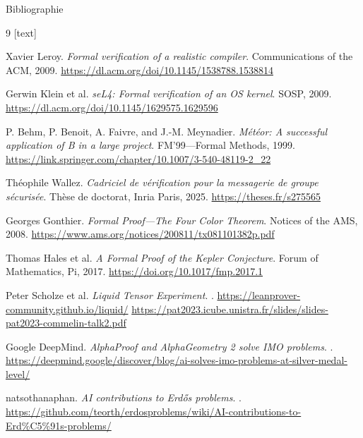 \documentclass[aspectratio=169]{beamer}
\begin{document}
\begin{frame}[allowframebreaks]{Bibliographie}
  \begin{thebibliography}{9}
    [text]

    Xavier Leroy.
    \newblock \emph{Formal verification of a realistic compiler}.
    \newblock Communications of the ACM, 2009.
    \newblock \url{https://dl.acm.org/doi/10.1145/1538788.1538814}

    Gerwin Klein et al.
    \newblock \emph{seL4: Formal verification of an OS kernel}.
    \newblock SOSP, 2009.
    \newblock \url{https://dl.acm.org/doi/10.1145/1629575.1629596}

    P. Behm, P. Benoit, A. Faivre, and J.-M. Meynadier.
    \newblock \emph{Météor: A successful application of B in a large project}.
    \newblock FM'99—Formal Methods, 1999.
    \newblock \url{https://link.springer.com/chapter/10.1007/3-540-48119-2_22}

    Théophile Wallez.
    \newblock \emph{Cadriciel de vérification pour la messagerie de groupe sécurisée}.
    \newblock Thèse de doctorat, Inria Paris, 2025.
    \newblock \url{https://theses.fr/s275565}

    Georges Gonthier.
    \newblock \emph{Formal Proof—The Four Color Theorem}.
    \newblock Notices of the AMS, 2008.
    \newblock \url{https://www.ams.org/notices/200811/tx081101382p.pdf}

    Thomas Hales et al.
    \newblock \emph{A Formal Proof of the Kepler Conjecture}.
    \newblock Forum of Mathematics, Pi, 2017.
    \newblock \url{https://doi.org/10.1017/fmp.2017.1}

    Peter Scholze et al.
    \newblock \emph{Liquid Tensor Experiment}.
    .
    \newblock \url{https://leanprover-community.github.io/liquid/}
    \newblock \url{https://pat2023.icube.unistra.fr/slides/slides-pat2023-commelin-talk2.pdf}

    Google DeepMind.
    \newblock \emph{AlphaProof and AlphaGeometry 2 solve IMO problems}.
    .
    \newblock \url{https://deepmind.google/discover/blog/ai-solves-imo-problems-at-silver-medal-level/}

    natsothanaphan.
    \newblock \emph{AI contributions to Erdős problems}.
    .
    \newblock \url{https://github.com/teorth/erdosproblems/wiki/AI-contributions-to-Erd\%C5\%91s-problems/}


\end{thebibliography}
\end{frame}
\end{document}
